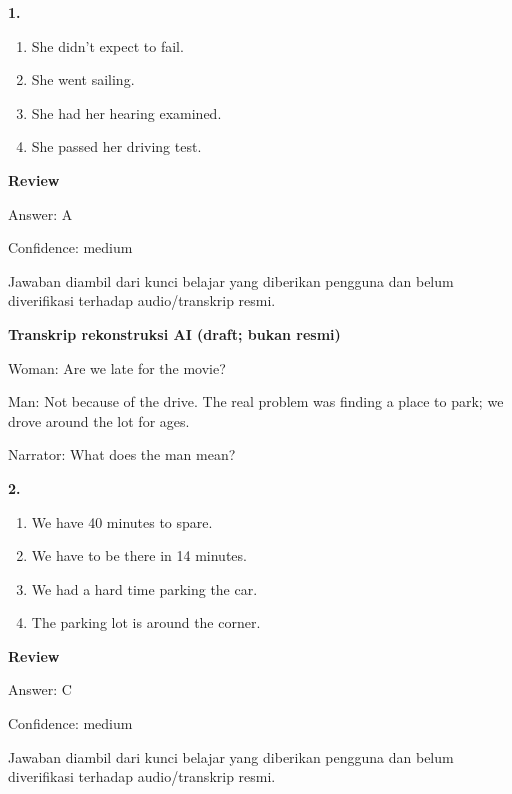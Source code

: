 \documentclass[12pt]{article}
\begin{document}
\noindent\textbf{1.}
\begin{enumerate}[label=(\Alph*),leftmargin=*,itemsep=0.2em]
\item She didn't expect to fail.
\item She went sailing.
\item She had her hearing examined.
\item She passed her driving test.
\end{enumerate}
\par
\begingroup
\setlength{\parskip}{0pt}
\setlength{\parindent}{0pt}
\textbf{Review}\par
Answer: A\par
Confidence: medium\par
Jawaban diambil dari kunci belajar yang diberikan pengguna dan belum diverifikasi terhadap audio/transkrip resmi.\par
\endgroup
\par
\vspace{0.25\baselineskip}
\begin{exampleblock}
\textbf{Transkrip rekonstruksi AI (draft; bukan resmi)}\par
Woman: Are we late for the movie?\par
Man: Not because of the drive. The real problem was finding a place to park; we drove around the lot for ages.\par
Narrator: What does the man mean?\par
\end{exampleblock}
\noindent\textbf{2.}
\begin{enumerate}[label=(\Alph*),leftmargin=*,itemsep=0.2em]
\item We have 40 minutes to spare.
\item We have to be there in 14 minutes.
\item We had a hard time parking the car.
\item The parking lot is around the corner.
\end{enumerate}
\par
\begingroup
\setlength{\parskip}{0pt}
\setlength{\parindent}{0pt}
\textbf{Review}\par
Answer: C\par
Confidence: medium\par
Jawaban diambil dari kunci belajar yang diberikan pengguna dan belum diverifikasi terhadap audio/transkrip resmi.\par
\endgroup
\par
\vspace{0.25\baselineskip}
\end{document}
